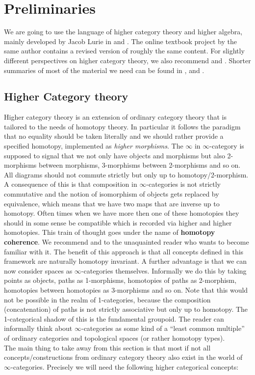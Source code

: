 \chapter{Preliminaries}\label{Prelims}
We are going to use the language of higher category theory and higher algebra, mainly developed by Jacob Lurie in \cite{HigherToposTheory} and \cite{lurie2017higher}. 
The online textbook project \cite{kerodon} by the same author contains a revised version of roughly the same content. For slightly different perspectives on higher category theory, we also recommend \cite{RiehlVerityElements} and \cite{cisinski2019higher}.
Shorter summaries of most of the material we need can be found in \cite{Grothshortcourse}, \cite{camarena2013whirlwind} and \cite{Gepnerintroductionhigher}.
\section{Higher Category theory}\label{highercats}
Higher category theory is an extension of ordinary category theory that is tailored to the needs of homotopy theory. In particular it follows the paradigm that no equality should be taken literally and we should rather provide a specified homotopy, implemented as \textit{higher morphisms}. 
The $\infty$ in $\infty$-category is supposed to signal that we not only have objects and morphisms but also 2-morphisms between morphisms, 3-morphisms between 2-morphisms and so on. All diagrams should not commute strictly but only up to homotopy/2-morphism. 
A consequence of this is that composition in $\infty$-categories is not strictly commutative and the notion of isomorphism of objects gets replaced by equivalence, which means that we have two maps that are inverse up to homotopy.
Often times when we have more then one of these homotopies they should in some sense be compatible which is recorded via higher and higher homotopies. This train of thought goes under the name of \textbf{homotopy coherence}.
We recommend \cite{riehl2018homotopy} and \cite[Section~1.2.6]{HigherToposTheory} to the unaquainted reader who wants  to become familiar with it. The benefit of this approach is that all concepts defined in this framework are naturally homotopy invariant.
A further advantage is that we can now consider spaces as $\infty$-categories themselves. Informally we do this by taking points as objects, paths as 1-morphisms, homotopies of paths as 2-morphism, homotopies between homotopies as 3-morphisms and so on. Note that this would not be possible in the realm of 1-categories, because the composition (concatenation) of paths is not strictly associative but only up to homotopy. The 1-categorical shadow of this is the fundamental groupoid. The reader can informally think about $\infty$-categories as some kind of a ``least common multiple'' of ordinary categories and topological spaces (or rather homotopy types).\\
The main thing to take away from this section is that most if not all concepts/constructions from ordinary category theory also exist in the world of $\infty$-categories.
Precisely we will need the following higher categorical concepts:


